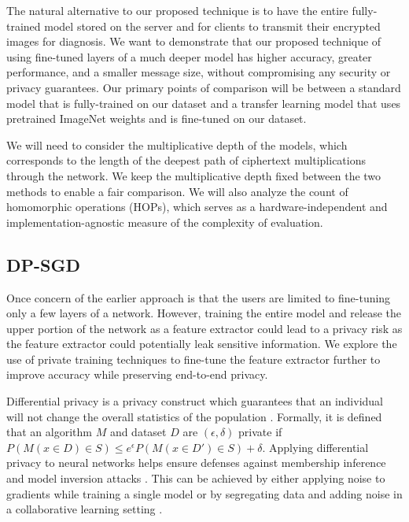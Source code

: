 \documentclass[conference]{IEEEtran}
\begin{document}
The natural alternative to our proposed technique is to have the entire fully-trained model stored on the server and for clients to transmit their encrypted images for diagnosis. 
We want to demonstrate that our proposed technique of using fine-tuned layers of a much deeper model has higher accuracy, greater performance, and a smaller message size, without compromising any security or privacy guarantees. Our primary points of comparison will be between a standard model that is fully-trained on our dataset and a transfer learning model that uses pretrained ImageNet weights and is fine-tuned on our dataset. 

We will need to consider the multiplicative depth of the models, which corresponds to the length of the deepest path of ciphertext multiplications through the network. We keep the multiplicative depth fixed between the two methods to enable a fair comparison. We will also analyze the count of homomorphic operations (HOPs), which serves as a hardware-independent and implementation-agnostic measure of the complexity of evaluation.  


\subsection{DP-SGD}

Once concern of the earlier approach is that the users are limited to fine-tuning only a few layers of a network. 
However, training the entire model and release the upper portion of the network as a feature extractor could lead to a privacy risk as the feature extractor could potentially leak sensitive information.
We explore the use of private training techniques to fine-tune the feature extractor further to improve accuracy while preserving end-to-end privacy.  

Differential privacy is a privacy construct which guarantees that an individual will not change the overall statistics of the population \cite{dwork2008differential}. Formally, it is defined that an algorithm $M$ and dataset $D$ are $(\epsilon,\delta)$ private if $P(M(x \in D) \in S)\leq e^\epsilon P(M(x \in D')\in S) + \delta$. Applying differential privacy to neural networks helps ensure defenses against membership inference and model inversion attacks \cite{abadi2017privatetwoapproaches}. This can be achieved by either applying noise to gradients while training a single model \cite{abadi2016dpsgd} \cite{song2013stochastic} or by segregating data and adding noise in a collaborative learning setting \cite{papernot2018scalable} \cite{shokri2015privacy}. 
\end{document}
